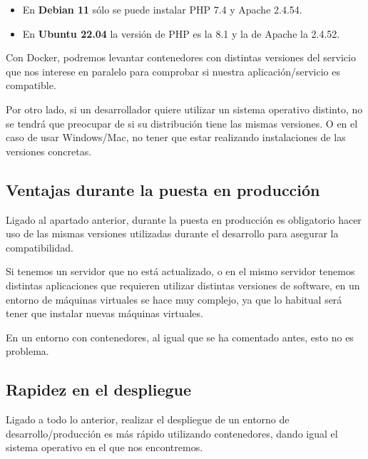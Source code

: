 \begin{itemize}
    \item En\textbf{ Debian 11} sólo se puede instalar PHP 7.4 y Apache 2.4.54.
    \item En \textbf{Ubuntu 22.04} la versión de PHP es la 8.1 y la de Apache la 2.4.52.
\end{itemize}

Con Docker, podremos levantar contenedores con distintas versiones del servicio que nos interese en paralelo para comprobar si nuestra aplicación/servicio es compatible.


Por otro lado, si un desarrollador quiere utilizar un sistema operativo distinto, no se tendrá que preocupar de si su distribución tiene las mismas versiones. O en el caso de usar Windows/Mac, no tener que estar realizando instalaciones de las versiones concretas.


\subsection{Ventajas durante la puesta en producción}
Ligado al apartado anterior, durante la puesta en producción es obligatorio hacer uso de las mismas versiones utilizadas durante el desarrollo para asegurar la compatibilidad.


Si tenemos un servidor que no está actualizado, o en el mismo servidor tenemos distintas aplicaciones que requieren utilizar distintas versiones de software, en un entorno de máquinas virtuales se hace muy complejo, ya que lo habitual será tener que instalar nuevas máquinas virtuales.


En un entorno con contenedores, al igual que se ha comentado antes, esto no es problema.

\subsection{Rapidez en el despliegue}

Ligado a todo lo anterior, realizar el despliegue de un entorno de desarrollo/producción es más rápido utilizando contenedores, dando igual el sistema operativo en el que nos encontremos.

